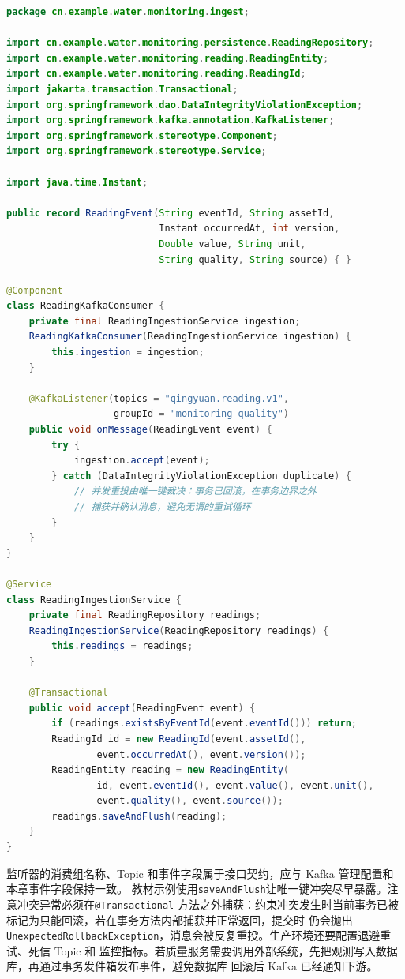 \begin{lstlisting}[label={lst:ch08-kafka-consumer},language=Java,caption={Kafka 观测事件消费与幂等写入}]
package cn.example.water.monitoring.ingest;

import cn.example.water.monitoring.persistence.ReadingRepository;
import cn.example.water.monitoring.reading.ReadingEntity;
import cn.example.water.monitoring.reading.ReadingId;
import jakarta.transaction.Transactional;
import org.springframework.dao.DataIntegrityViolationException;
import org.springframework.kafka.annotation.KafkaListener;
import org.springframework.stereotype.Component;
import org.springframework.stereotype.Service;

import java.time.Instant;

public record ReadingEvent(String eventId, String assetId,
                           Instant occurredAt, int version,
                           Double value, String unit,
                           String quality, String source) { }

@Component
class ReadingKafkaConsumer {
    private final ReadingIngestionService ingestion;
    ReadingKafkaConsumer(ReadingIngestionService ingestion) {
        this.ingestion = ingestion;
    }

    @KafkaListener(topics = "qingyuan.reading.v1",
                   groupId = "monitoring-quality")
    public void onMessage(ReadingEvent event) {
        try {
            ingestion.accept(event);
        } catch (DataIntegrityViolationException duplicate) {
            // 并发重投由唯一键裁决：事务已回滚，在事务边界之外
            // 捕获并确认消息，避免无谓的重试循环
        }
    }
}

@Service
class ReadingIngestionService {
    private final ReadingRepository readings;
    ReadingIngestionService(ReadingRepository readings) {
        this.readings = readings;
    }

    @Transactional
    public void accept(ReadingEvent event) {
        if (readings.existsByEventId(event.eventId())) return;
        ReadingId id = new ReadingId(event.assetId(),
                event.occurredAt(), event.version());
        ReadingEntity reading = new ReadingEntity(
                id, event.eventId(), event.value(), event.unit(),
                event.quality(), event.source());
        readings.saveAndFlush(reading);
    }
}
\end{lstlisting}

监听器的消费组名称、Topic 和事件字段属于接口契约，应与 Kafka 管理配置和本章事件字段保持一致。
教材示例使用\texttt{saveAndFlush}让唯一键冲突尽早暴露。注意冲突异常必须在\texttt{@Transactional}
方法之外捕获：约束冲突发生时当前事务已被标记为只能回滚，若在事务方法内部捕获并正常返回，提交时
仍会抛出\texttt{UnexpectedRollbackException}，消息会被反复重投。生产环境还要配置退避重试、死信 Topic 和
监控指标。若质量服务需要调用外部系统，先把观测写入数据库，再通过事务发件箱发布事件，避免数据库
回滚后 Kafka 已经通知下游。

